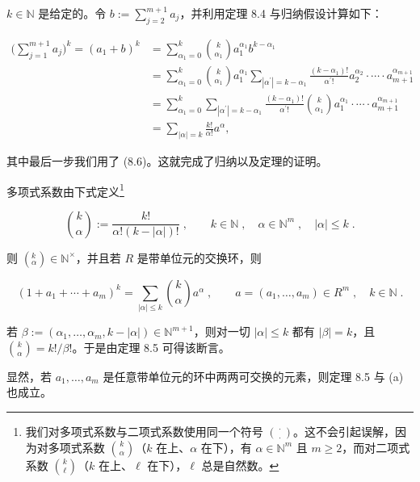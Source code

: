 \begin{theorem}
 $ k \in \mathbb{N} $ 是给定的。令  $ b := \sum_{j=2}^{m+1} a_j $，并利用定理 8.4 与归纳假设计算如下：

\begin{equation*}
\begin{aligned}
\Big(\sum_{j=1}^{m+1}a_{j}\Big)^{k}=(a_{1}+b)^{k}&=\sum_{\alpha_{1}=0}^{k}\binom{k}{\alpha_{1}}a_{1}^{\alpha_{1}}b^{k-\alpha_{1}}\\&=\sum_{\alpha_{1}=0}^{k}\binom{k}{\alpha_{1}}a_{1}^{\alpha_{1}}\sum_{|\alpha^{\prime}|=k-\alpha_{1}}\frac{(k-\alpha_{1})!}{\alpha^{\prime}!}a_{2}^{\alpha_{2}}\cdot\cdots\cdot a_{m+1}^{\alpha_{m+1}}\\&=\sum_{\alpha_{1}=0}^{k}\sum_{|\alpha^{\prime}|=k-\alpha_{1}}\frac{(k-\alpha_{1})!}{\alpha^{\prime}!}\binom{k}{\alpha_{1}}a_{1}^{\alpha_{1}}\cdot\cdots\cdot a_{m+1}^{\alpha_{m+1}}\\&=\sum_{|\alpha|=k}\frac{k!}{\alpha!}a^{\alpha},
\end{aligned}
\end{equation*}

其中最后一步我们用了 (8.6)。这就完成了归纳以及定理的证明。

\end{theorem}

\begin{remark}

\begin{items}
\item

多项式系数由下式定义\footnote{我们对多项式系数与二项式系数使用同一个符号 $\binom{\cdot}{\cdot}$。这不会引起误解，因为对多项式系数 $\binom{k}{\alpha}$（$k$ 在上、$\alpha$ 在下），有 $\alpha \in \mathbb{N}^m$ 且 $m \geq 2$，而对二项式系数 $\binom{k}{\ell}$（$k$ 在上、$\ell$ 在下），$\ell$ 总是自然数。}

\[
\binom{k}{\alpha}:=\frac{k!}{\alpha!(k-|\alpha|)!}\;,\qquad k\in\mathbb{N}\;,\quad\alpha\in\mathbb{N}^{m}\;,\quad|\alpha|\leq k\;.
\]

则  $ (^k_\alpha) \in \mathbb{N}^\times $，并且若  $ R $ 是带单位元的交换环，则

\[
(1+a_{1}+\cdots+a_{m})^{k}=\sum_{|\alpha|\leq k}{\binom{k}{\alpha}}a^{\alpha}\;,\qquad a=(a_{1},\ldots,a_{m})\in R^{m}\;,\quad k\in\mathbb{N}\;.
\]

\proofhead
若  $ \beta := (\alpha_1, \ldots, \alpha_m, k - |\alpha|) \in \mathbb{N}^{m+1} $，则对一切  $ |\alpha| \leq k $ 都有  $ |\beta| = k $，且  $ \binom{k}{\alpha} = k! / \beta! $。于是由定理 8.5 可得该断言。
\item

显然，若  $ a_1, \ldots, a_m $ 是任意带单位元的环中两两可交换的元素，则定理 8.5 与 (a) 也成立。

\end{items}

\end{remark}

